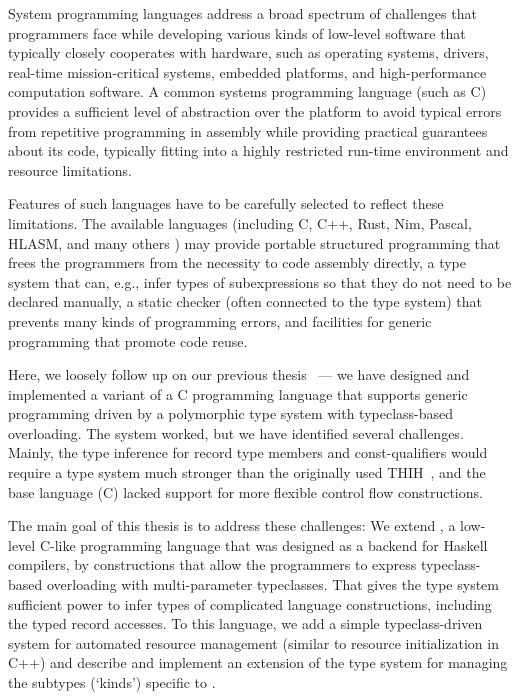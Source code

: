
System programming languages address a broad spectrum of challenges that programmers face while developing various kinds of low-level software that typically closely cooperates with hardware, such as operating systems, drivers, real-time mission-critical systems, embedded platforms, and high-performance computation software.
A common systems programming language (such as C) provides a sufficient level of abstraction over the platform to avoid typical errors from repetitive programming in assembly while providing practical guarantees about its code, typically fitting into a highly restricted run-time environment and resource limitations.

Features of such languages have to be carefully selected to reflect these limitations.
The available languages (including C, C++, Rust, Nim, Pascal, HLASM, and many others ) may provide portable structured programming that frees the programmers from the necessity to code assembly directly, a type system that can, e.g., infer types of subexpressions so that they do not need to be declared manually, a static checker (often connected to the type system) that prevents many kinds of programming errors, and facilities for generic programming that promote code reuse.

Here, we loosely follow up on our previous thesis~\cite{klepl2020type} --- we have designed and implemented a variant of a C programming language that supports generic programming driven by a polymorphic type system with typeclass-based overloading.
The system worked, but we have identified several challenges.
Mainly, the type inference for record type members and const-qualifiers would require a type system much stronger than the originally used THIH~\cite{jones1999typing}, and the base language (C) lacked support for more flexible control flow constructions.

The main goal of this thesis is to address these challenges: We extend \cmm, a low-level C-like programming language that was designed as a backend for Haskell compilers, by constructions that allow the programmers to express typeclass-based overloading with multi-parameter typeclasses. That gives the type system sufficient power to infer types of complicated language constructions, including the typed record accesses. To this language, we add a simple typeclass-driven system for automated resource management (similar to resource initialization in C++) and describe and implement an extension of the type system for managing the subtypes (`kinds') specific to \cmm.

